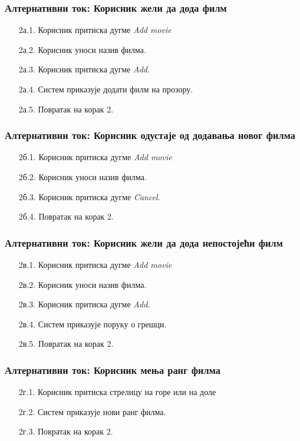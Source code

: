 \documentclass[12pt,a4paper]{article}
\begin{document}
\subsubsection{Алтернативни ток: Корисник жели да дода филм} 
 \begin{enumerate}
        \item[2а.1.] Корисник притиска дугме \textit{Add movie}
        \item[2а.2.] Корисник уноси назив филма.   
        \item[2а.3.] Корисник притиска дугме \textit{Add}.
        \item[2а.4.] Систем приказује додати филм на прозору.
        \item[2а.5.] Повратак на корак 2.
\end{enumerate}

\subsubsection{Алтернативни ток: Корисник одустаје од додавања новог филма} 
 \begin{enumerate}
        \item[2б.1.] Корисник притиска дугме \textit{Add movie}
        \item[2б.2.] Корисник уноси назив филма.   
        \item[2б.3.] Корисник притиска дугме \textit{Cancel}.
        \item[2б.4.] Повратак на корак 2.
\end{enumerate}

\subsubsection{Алтернативни ток: Корисник жели да дода непостојећи филм} 
 \begin{enumerate}
        \item[2в.1.] Корисник притиска дугме \textit{Add movie}
        \item[2в.2.] Корисник уноси назив филма.   
        \item[2в.3.] Корисник притиска дугме \textit{Add}.
        \item[2в.4.] Систем приказује поруку о грешци.
        \item[2в.5.] Повратак на корак 2.
\end{enumerate}

\subsubsection{Алтернативни ток: Корисник мења ранг филма} 
 \begin{enumerate}
        \item[2г.1.] Корисник притиска стрелицу на горе или на доле
        \item[2г.2.] Систем приказује нови ранг филма.
        \item[2г.3.] Повратак на корак 2.
\end{enumerate}
\end{document}
